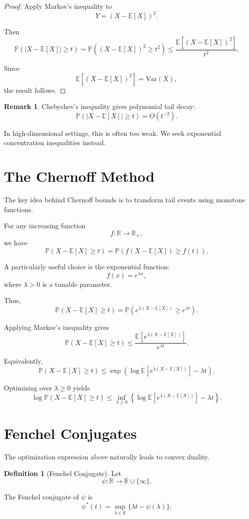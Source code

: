 \documentclass[12pt,oneside]{book}
\numberwithin{equation}{section}
\theoremstyle{definition}
\newtheorem{definition}{Definition}[section]
\newtheorem{remark}{Remark}[section]
\theoremstyle{plain}
\theoremstyle{remark}
\newcommand{\R}{\mathbb{R}}
\newcommand{\E}{\mathbb{E}}
\newcommand{\Var}{\mathrm{Var}}
\newcommand{\Prob}{\mathbb{P}}
\begin{document}
\begin{proof}
Apply Markov's inequality to
\[
Y=(X-\E[X])^2.
\]

Then
\[
\Prob(|X-\E[X]|\geq t)
=
\Prob((X-\E[X])^2\geq t^2)
\leq
\frac{\E[(X-\E[X])^2]}{t^2}.
\]

Since
\[
\E[(X-\E[X])^2]
=
\Var(X),
\]
the result follows.
\end{proof}

\begin{remark}
Chebyshev's inequality gives polynomial tail decay:
\[
\Prob(|X-\E[X]|\geq t)
=
O(t^{-2}).
\]

In high-dimensional settings, this is often too weak. We seek exponential concentration inequalities instead.
\end{remark}

\section{The Chernoff Method}

The key idea behind Chernoff bounds is to transform tail events using monotone functions.

For any increasing function
\[
f:\R\to\R_+,
\]
we have
\[
\Prob(X-\E[X]\geq t)
=
\Prob(f(X-\E[X])\geq f(t)).
\]

A particularly useful choice is the exponential function:
\[
f(x)=e^{\lambda x},
\]
where $\lambda>0$ is a tunable parameter.

Thus,
\[
\Prob(X-\E[X]\geq t)
=
\Prob(e^{\lambda(X-\E[X])}\geq e^{\lambda t}).
\]

Applying Markov's inequality gives
\[
\Prob(X-\E[X]\geq t)
\leq
\frac{\E[e^{\lambda(X-\E[X])}]}{e^{\lambda t}}.
\]

Equivalently,
\[
\Prob(X-\E[X]\geq t)
\leq
\exp\left(
\log\E[e^{\lambda(X-\E[X])}]
-
\lambda t
\right).
\]

Optimizing over $\lambda\geq0$ yields
\[
\log\Prob(X-\E[X]\geq t)
\leq
\inf_{\lambda\geq0}
\left\{
\log\E[e^{\lambda(X-\E[X])}]
-
\lambda t
\right\}.
\]

\section{Fenchel Conjugates}

The optimization expression above naturally leads to convex duality.

\begin{definition}[Fenchel Conjugate]
Let
\[
\psi:\R\to\R\cup\{\infty\}.
\]

The Fenchel conjugate of $\psi$ is
\[
\psi^*(t)
=
\sup_{\lambda\in\R}
\{
\lambda t-\psi(\lambda)
\}.
\]
\end{definition}
\end{document}
